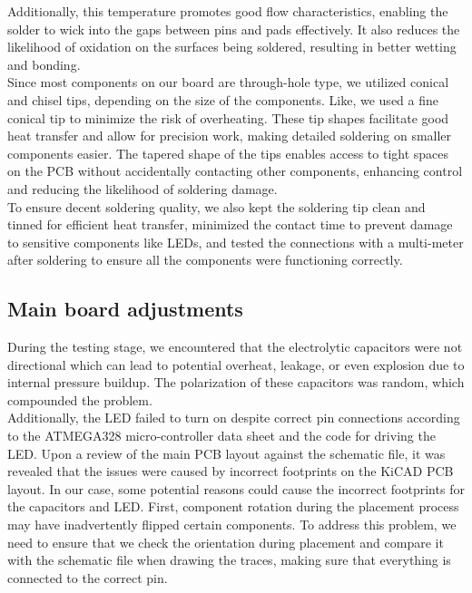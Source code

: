 Additionally, this temperature promotes good flow characteristics, enabling the solder to wick into the gaps between pins and pads effectively. It also reduces the likelihood of oxidation on the surfaces being soldered, resulting in better wetting and bonding.  
\\

Since most components on our board are through-hole type, we utilized conical and chisel tips, depending on the size of the components. Like, we used a fine conical tip to minimize the risk of overheating. These tip shapes facilitate good heat transfer and allow for precision work, making detailed soldering on smaller components easier. The tapered shape of the tips enables access to tight spaces on the PCB without accidentally contacting other components, enhancing control and reducing the likelihood of soldering damage. 
\\

To ensure decent soldering quality, we also kept the soldering tip clean and tinned for efficient heat transfer, minimized the contact time to prevent damage to sensitive components like LEDs, and tested the connections with a multi-meter after soldering to ensure all the components were functioning correctly. 

\subsection{Main board adjustments}

During the testing stage, we encountered that the electrolytic capacitors were not directional which can lead to potential overheat, leakage, or even explosion due to internal pressure buildup. The polarization of these capacitors was random, which compounded the problem.  
\\

Additionally, the LED failed to turn on despite correct pin connections according to the ATMEGA328 micro-controller data sheet and the code for driving the LED. Upon a review of the main PCB layout against the schematic file, it was revealed that the issues were caused by incorrect footprints on the KiCAD PCB layout. In our case, some potential reasons could cause the incorrect footprints for the capacitors and LED. First, component rotation during the placement process may have inadvertently flipped certain components. To address this problem, we need to ensure that we check the orientation during placement and compare it with the schematic file when drawing the traces, making sure that everything is connected to the correct pin.  
\\

